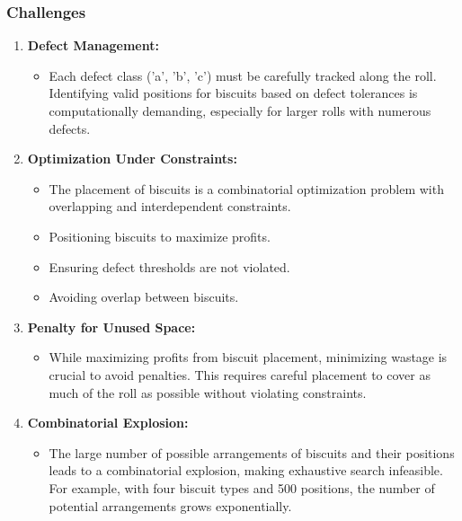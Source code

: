 \documentclass{modeleRapport}
\begin{document}
\subsubsection{Challenges}

\begin{enumerate}
    \item \textbf{Defect Management:}
    \begin{itemize}
        \item Each defect class ('a', 'b', 'c') must be carefully tracked along the roll. Identifying valid positions 
        for biscuits based on defect tolerances is computationally demanding, especially for larger rolls with numerous defects.
    \end{itemize}

    \item \textbf{Optimization Under Constraints:}
    \begin{itemize}
        \item The placement of biscuits is a combinatorial optimization problem with overlapping and interdependent constraints.
        \item Positioning biscuits to maximize profits.
        \item Ensuring defect thresholds are not violated.
        \item Avoiding overlap between biscuits.
    \end{itemize}

    \item \textbf{Penalty for Unused Space:}
    \begin{itemize}
        \item While maximizing profits from biscuit placement, minimizing wastage is crucial to avoid penalties. 
        This requires careful placement to cover as much of the roll as possible without violating constraints.
    \end{itemize}

    \item \textbf{Combinatorial Explosion:}
    \begin{itemize}
        \item The large number of possible arrangements of biscuits and their positions leads to a combinatorial explosion, 
        making exhaustive search infeasible. For example, with four biscuit types and 500 positions, the number of potential 
        arrangements grows exponentially.
    \end{itemize}


\end{enumerate}
\end{document}
